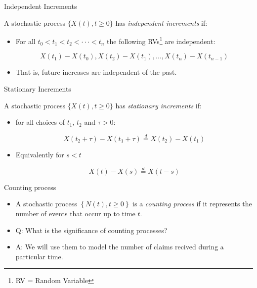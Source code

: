 \documentclass[11pt]{beamer}
\begin{document}
\begin{frame}{Independent Increments} 

A stochastic process $\{X (t), t\ge 0\}$ has \alert{\textit{independent increments
}} if:

\begin{itemize}
\item For all $t_0<t_{1}<t_{2}<\cdot \cdot \cdot <t_{n}$ the following RVs\footnote{RV = Random Variable} are independent:

$$X\left( t_{1}\right)-X\left( t_{0}\right) ,X\left( t_{2}\right) -X\left( t_{1}\right) ,...,%
X\left( t_{n}\right) -X\left( t_{n-1}\right) $$ 

\vfill

\item That is, future increases are independent of the past.


\end{itemize}

\end{frame}
\begin{frame}{Stationary Increments} 

A stochastic process $\{X (t), t\ge 0\}$ has \alert{\textit{stationary increments }}
if:

\begin{itemize}

\item for all choices of $t_{1}$, $t_{2}$ and $\tau >0$:

$$ X\left( t_{2}+\tau \right) -X\left( t_{1}+\tau \right) \stackrel{d}{=} X\left( t_{2}\right) -X\left( t_{1}\right)$$

\vfill

\item Equivalently for $s<t$

$$ X\left( t \right) -X\left(s \right) \stackrel{d}{=} X\left( t-s \right)$$

\end{itemize}

\end{frame}
\begin{frame}{Counting process}

\begin{itemize}

\item A stochastic process $\left\{ N\left( t\right) ,t\geq 0\right\} $
is a \alert{\textit{counting process}} if it represents the number of events that
occur up to time $t.$

\vfill

\item Q: What is the significance of counting processes?

\vfill

\item A: We will use them to model the number of claims recived during a particular time. 

\end{itemize}

\end{frame}
\end{document}
